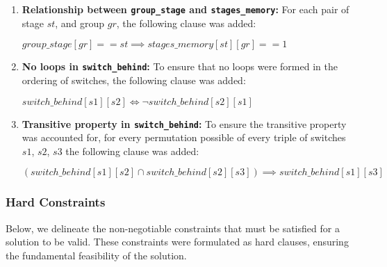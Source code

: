 \begin{enumerate}
    \item \textbf{Relationship between \texttt{group\_stage} and \texttt{stages\_memory}:} For each pair of stage $st$, and group $gr$, the following clause was added:
    \begin{center}
        \(group\_stage[gr] == st \implies stages\_memory[st][gr] == 1\)
    \end{center}

    \item \textbf{No loops in \texttt{switch\_behind}:} To ensure that no loops were formed in the ordering of switches, the following clause was added:
    \begin{center}
        \(switch\_behind[s1][s2] \Leftrightarrow \neg switch\_behind[s2][s1]\)
    \end{center}

    \item \textbf{Transitive property in \texttt{switch\_behind}:} To ensure the transitive property was accounted for, for every permutation possible of every triple of switches $s1$, $s2$, $s3$ the following clause was added:
    \begin{center}
        \((switch\_behind[s1][s2] \cap switch\_behind[s2][s3]) \implies switch\_behind[s1][s3]\)
    \end{center}
\end{enumerate}

\subsubsection{Hard Constraints}

Below, we delineate the non-negotiable constraints that must be satisfied for a solution to be valid. These constraints were formulated as hard clauses, ensuring the fundamental feasibility of the solution.

